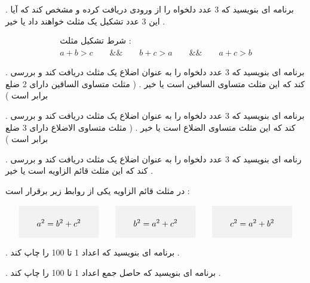 \documentclass[12pt]{article}
\begin{document}
 . برنامه ای بنویسید که 3 عدد دلخواه را از ورودی دریافت کرده و مشخص کند که آیا این 3 عدد تشکیل یک مثلث خواهند داد یا خیر .



\begin{align*}
\text{شرط تشکیل مثلث : } \\ 
a+b>c \qquad \&\& \qquad b+c>a \qquad \&\& \qquad a+c>b
\end{align*}










 . برنامه ای بنویسید که 3 عدد دلخواه را به عنوان اضلاع یک مثلث دریافت کند و بررسی کند که این مثلث متساوی الساقین است یا خیر . ( مثلث متساوی الساقین دارای 2 ضلع برابر است )








 . برنامه ای بنویسید که 3 عدد دلخواه را به عنوان اضلاع یک مثلث دریافت کند و بررسی کند که این مثلث متساوی الضلاع است یا خیر . ( مثلث متساوی الاضلاع دارای 3 ضلع برابر است )














 . رنامه ای بنویسید که 3 عدد دلخواه را به عنوان اضلاع یک مثلث دریافت کند و بررسی کند که این مثلث قائم الزاویه است یا خیر . 

در مثلث قائم الزاویه یکی از روابط زیر برقرار است :


\begin{align*}
\colorbox{gray!10}{\parbox{90pt}{
$$a^{2} = b^{2} + c^{2}$$
}}
\qquad
\colorbox{gray!10}{\parbox{90pt}{
$$b^{2} = a^{2} + c^{2}$$
}}
\qquad
\colorbox{gray!10}{\parbox{90pt}{
$$c^{2} = a^{2} + b^{2} $$
}}
\end{align*}













 . برنامه ای بنویسید که اعداد 1 تا 100 را چاپ کند .








 . برنامه ای بنویسید که حاصل جمع اعداد 1 تا 100 را چاپ کند .
\end{document}
